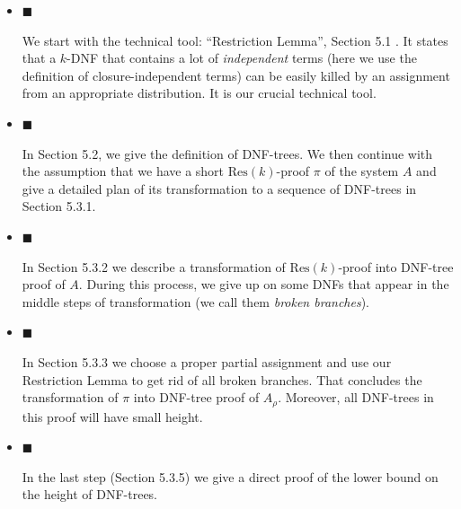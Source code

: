 \begin{itemize}


\item[] 
$\blacksquare$ 


We start with the technical tool: “Restriction Lemma”, Section 5.1 .
It states that a
$k$-DNF that contains a lot of \emph{independent} terms (here we use the definition of
closure-independent terms) can be easily killed by an assignment from an appropriate distribution. It
is our crucial technical tool.\par





\item[] 
$\blacksquare$ 


In Section 5.2, we give the definition of
DNF-trees. We then continue with the assumption that we have a short $\mathrm{Res}(k)$-proof $\pi$ of the
system $A$ and give a detailed plan of its transformation to a sequence of DNF-trees in
Section 5.3.1.\par





\item[] 
$\blacksquare$ 


In Section 5.3.2 we describe a transformation of $\mathrm{Res}(k)$-proof into DNF-tree proof of
$A$. During this process, we give up on some DNFs that appear in the middle steps of
transformation (we call them \emph{broken branches}).\par





\item[] 
$\blacksquare$ 


In Section 5.3.3 we choose a proper partial assignment and use our
Restriction Lemma to get
rid of all broken branches. That concludes the transformation of $\pi$ into DNF-tree proof of
$A_{\rho}$. Moreover, all DNF-trees in this proof will have small height.\par





\item[] 
$\blacksquare$ 


In the last step (Section 5.3.5) we give a direct proof of the lower bound
on the height of DNF-trees.\par





\end{itemize}




